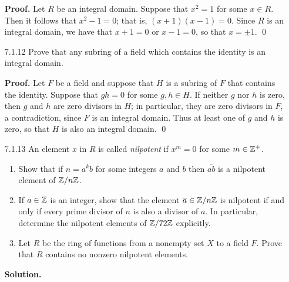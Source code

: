 \begin{enumerate}
      \textbf{Proof.} Let $R$ be an integral domain. Suppose that $x^2 = 1$ for
      some $x \in R$. Then it follows that $x^2 - 1 = 0$; that is,
      $(x + 1)(x - 1) = 0$. Since $R$ is an integral domain, we have that
      $x + 1 = 0$ or $x - 1 = 0$, so that $x = \pm1$. \qed
   \item[7.1.12]  Prove that any subring of a field which contains the identity
                  is an integral domain.

      \textbf{Proof.} Let $F$ be a field and suppose that $H$ is a subring of
      $F$ that contains the identity. Suppose that $gh = 0$ for some
      $g, h \in H$. If neither $g$ nor $h$ is zero, then $g$ and $h$ are zero
      divisors in $H$; in particular, they are zero divisors in $F$, a
      contradiction, since $F$ is an integral domain. Thus at least one of $g$
      and $h$ is zero, so that $H$ is also an integral domain. \qed
   \item[7.1.13]  An element $x$ in $R$ is called \textit{nilpotent} if
                  $x^m = 0$ for some $m \in \mathbb{Z}^+$.
                  \begin{enumerate}
                     \item Show that if $n = a^kb$ for some integers $a$ and $b$
                           then $\overline{ab}$ is a nilpotent element of
                           $\mathbb{Z}/n\mathbb{Z}$.
                     \item If $a \in \mathbb{Z}$ is an integer, show that the element
                           $\overline{a} \in \mathbb{Z}/n\mathbb{Z}$ is nilpotent if and only if
                           every prime divisor of $n$ is also a divisor of $a$.
                           In particular, determine the nilpotent elements of
                           $\mathbb{Z}/72\mathbb{Z}$ explicitly.
                     \item Let $R$ be the ring of functions from a nonempty set
                           $X$ to a field $F$. Prove that $R$ contains no
                           nonzero nilpotent elements.
                  \end{enumerate}

      \textbf{Solution.}


\end{enumerate}
